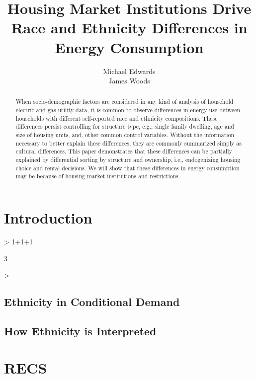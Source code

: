 \documentclass{article}
\author{Michael Edwards\\ 
  James Woods}
\title{Housing Market Institutions Drive Race and Ethnicity Differences in Energy Consumption}
\begin{document}
\maketitle


\begin{abstract}

When socio-demographic factors are considered in any kind of analysis of household electric and gas utility data, it is common to observe differences in energy use between households with different self-reported race and ethnicity compositions. These differences persist controlling for structure type, e.g., single family dwelling, age and size of housing units, and, other common control variables. Without the information necessary to better explain these differences, they are commonly summarized simply as cultural differences. This paper demonstrates that these differences can be partially explained by differential sorting by structure and ownership, i.e., endogenizing housing choice and rental decisions. We will show that these differences in energy consumption may be because of housing market institutions and restrictions.
\end{abstract}

\section{Introduction}


\begin{Schunk}
\begin{Sinput}
> 1+1+1
\end{Sinput}
\begin{Soutput}
[1] 3
\end{Soutput}
\begin{Sinput}
> 
\end{Sinput}
\end{Schunk}

\cite{RBase}

  \subsection{Ethnicity in Conditional Demand}
  \subsection{How Ethnicity is Interpreted}

\section{RECS}
\end{document}

